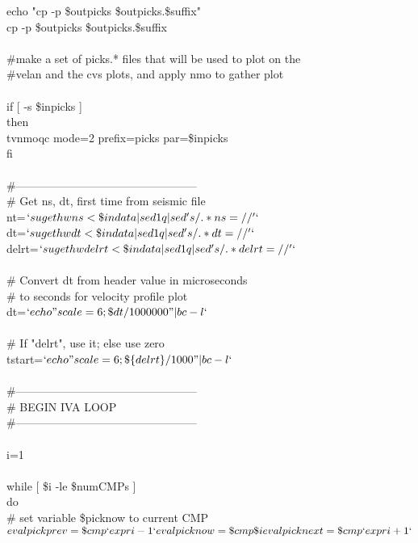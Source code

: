 echo  "cp -p \$outpicks \$outpicks.\$suffix" \\
cp -p \$outpicks \$outpicks.\$suffix \\
 \\
\#make a set of picks.* files that will be used to plot on the \\
\#velan and the cvs plots, and apply nmo to gather plot \\
 \\
if [ -s \$inpicks ] \\
then \\
 tvnmoqc mode=2 prefix=picks par=\$inpicks \\
fi \\
 \\
\#------------------------------------------------ \\
\# Get ns, dt, first time from seismic file \\
nt=$`sugethw ns < \$indata | sed 1q | sed 's/.*ns=//'`$ \\
dt=$`sugethw dt < \$indata | sed 1q | sed 's/.*dt=//'`$ \\
delrt=$`sugethw delrt < \$indata | sed 1q | sed 's/.*delrt=//'`$ \\
 \\
\# Convert dt from header value in microseconds \\
\# to seconds for velocity profile plot \\
dt=$`echo "scale=6; \$dt / 1000000 " | bc -l`$ \\
 \\
\# If "delrt", use it; else use zero \\
tstart=$`echo "scale=6; \$\{delrt\} / 1000" | bc -l`$ \\
 \\
\#------------------------------------------------ \\
\# BEGIN IVA LOOP \\
\#------------------------------------------------ \\
 \\
i=1 \\
 \\
while [ \$i -le \$numCMPs ] \\
do \\
 \# set variable \$picknow to current CMP \\
 $eval pickprev=\$cmp`expr i - 1` \\
 eval picknow=\$cmp\$i \\
 eval picknext=\$cmp`expr i + 1` $\\
